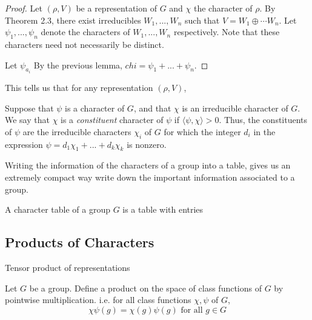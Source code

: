 \begin{proof}
    Let $(\rho, V)$ be a representation of $G$ and $\chi$ the character of $\rho$. By Theorem 2.3, there exist 
irreducibles $W_1, ..., W_n$ such that $V = W_1 \oplus \cdots W_n$. Let $\psi_1, ..., \psi_n$ denote the characters 
of $W_1, ..., W_n$ respectively. Note that these characters need not necessarily be distinct.

Let $\psi_{a_i}$
By the previous lemma, $chi = \psi_1 + ... +  \psi_n$.  

\end{proof}

This tells us that for any representation $(\rho, V)$, 


\begin{definition}
    Suppose that $\psi$ is a character of $G$, and that $\chi$ is an irreducible character of $G$. We say that 
    $\chi$ is a \emph{constituent} character of $\psi$ if $\langle \psi, \chi \rangle > 0$. Thus, the constituents 
    of $\psi$ are the irreducible characters $\chi_i$ of $G$ for which the integer $d_i$ in the expression $\psi = 
    d_1\chi_1 + ... + d_k\chi_k$ is nonzero.
\end{definition}



    Writing the information of the characters of a group into a table, gives us an extremely compact way write down 
    the important information associated to a group.

\begin{definition}
    A character table of a group $G$ is a table with entries 
    


\end{definition}









\subsection{Products of Characters}

\begin{definition}
    Tensor product of representations
\end{definition}

\begin{definition}
    Let $G$ be a group. Define a product on the space of class functions of $G$ by pointwise multiplication. i.e.
    for all class functions $\chi, \psi$ of $G$, 
    \[
        \chi\psi(g) = \chi(g)\psi(g) \text{ for all } g \in G
    \]
\end{definition}


